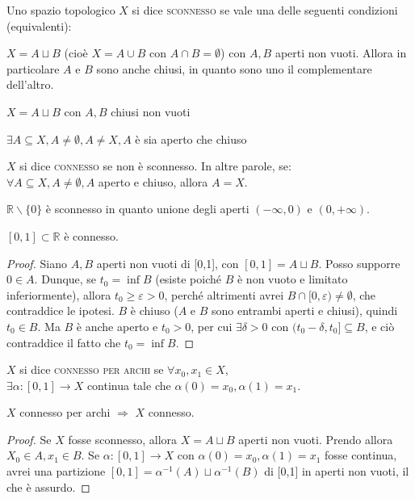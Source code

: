 \begin{defn}
Uno spazio topologico $X$ si dice \textsc{sconnesso} se vale una delle seguenti condizioni (equivalenti):
\begin{nlist}
\item $X=A \sqcup B$ (cioè $X=A \cup B$ con $A \cap B = \emptyset$) con $A,B$ aperti non vuoti. Allora in particolare $A$ e $B$ sono anche chiusi, in quanto sono uno il complementare dell'altro.
\item $X=A \sqcup B$ con $A,B$ chiusi non vuoti
\item $\exists A \subseteq X, A \neq \emptyset, A \neq X, A$ è sia aperto che chiuso
\end{nlist}
\end{defn}

\begin{defn}
$X$ si dice \textsc{connesso} se non è sconnesso. In altre parole, se: \\ $\forall A \subseteq X, A \neq \emptyset, A$ aperto e chiuso, allora $A=X$.
\end{defn}

\begin{ex}
$\mathbb{R} \smallsetminus \{0\}$ è sconnesso in quanto unione degli aperti $(-\infty,0)$ e $(0,+\infty)$.
\end{ex}

\begin{thm}
$[0,1] \subset \mathbb{R}$ è connesso.
\end{thm}
\begin{proof}
Siano $A,B$ aperti non vuoti di [0,1], con $[0,1]=A \sqcup B$. Posso supporre $0 \in A$. Dunque, se $t_0=\inf B$ (esiste poiché $B$ è non vuoto e limitato inferiormente), allora $t_0 \ge \varepsilon >0$, perché altrimenti avrei $B \cap [0,\varepsilon) \neq \emptyset$, che contraddice le ipotesi. $B$ è chiuso ($A$ e $B$ sono entrambi aperti e chiusi), quindi $t_0 \in B$. Ma $B$ è anche aperto e $t_0 >0$, per cui $\exists \delta >0$ con $(t_0-\delta, t_0] \subseteq B$, e ciò contraddice il fatto che $t_0=\inf B$.
\end{proof}

\begin{defn}
$X$ si dice \textsc{connesso per archi} se $\forall x_0,x_1 \in X$, \\
$\exists \alpha:[0,1] \longrightarrow X$ continua tale che $\alpha (0)=x_0, \alpha (1)=x_1$.
\end{defn}

\begin{prop}
$X$ connesso per archi $\Longrightarrow$ $X$ connesso.
\end{prop}
\begin{proof}
Se $X$ fosse sconnesso, allora $X=A \sqcup B$ aperti non vuoti. Prendo allora $X_0 \in A, x_1 \in B$. Se $\alpha:[0,1] \longrightarrow X$ con $\alpha (0)=x_0, \alpha (1)=x_1$ fosse continua, avrei una partizione $[0,1]=\alpha ^{-1}(A) \sqcup \alpha ^{-1}(B)$ di [0,1] in aperti non vuoti, il che è assurdo.
\end{proof}


